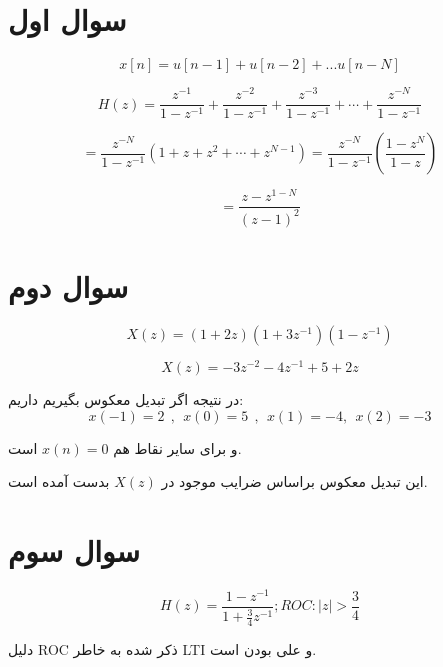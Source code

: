 \documentclass[12pt]{article}
\begin{document}
\KashidaOff

\section{سوال اول}



$$x[n] =  u[n-1] + u[n-2] + ... u[n-N]$$

$$H(z) = \frac{z^{-1}}{1 - z^{-1}} + \frac{z^{-2}}{1 - z^{-1}} + \frac{z^{-3}}{1 - z^{-1}} + \cdots + \frac{z^{-N}}{1 - z^{-1}}$$

$$= \frac{z^{-N}}{1 -z^{-1}}(1+z+z^2 + \cdots + z^{N-1}) = \frac{z^{-N}}{1 -z^{-1}} (\frac{1-z^N}{1-z})$$

$$=\frac{z-z^{1-N}}{(z-1)^2}$$

\section{سوال دوم}

$$
X(z)=(1+2 z)\left(1+3 z^{-1}\right)\left(1-z^{-1}\right)
$$

$$X(z) = -3 z^{-2} - 4 z^{-1} + 5 + 2z$$

در نتیجه اگر تبدیل معکوس بگیریم داریم:
$$x(-1) = 2 ~~,~~ x(0) = 5 ~~,~~ x(1) = -4 , ~~x(2) = -3$$

و برای سایر نقاط هم $x(n) = 0$ است.

این تبدیل معکوس براساس ضرایب موجود در $X(z)$ بدست آمده است.



\section{سوال سوم}

$$
H(z)=\frac{1-z^{-1}}{1+\frac{3}{4} z^{-1}} ; ROC:‍ |z| > \frac{3}{4}
$$

دلیل ROC ذکر شده به خاطر LTI و علی بودن است.
\end{document}
